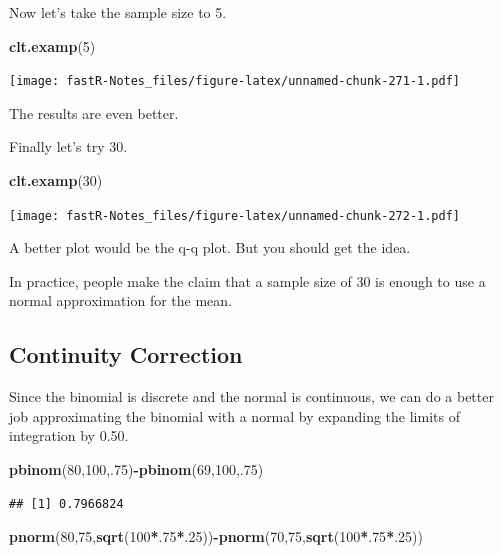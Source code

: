 \documentclass[]{book}
\newenvironment{Shaded}{\begin{snugshade}}{\end{snugshade}}
\newcommand{\KeywordTok}[1]{\textcolor[rgb]{0.13,0.29,0.53}{\textbf{#1}}}
\newcommand{\DecValTok}[1]{\textcolor[rgb]{0.00,0.00,0.81}{#1}}
\newcommand{\OperatorTok}[1]{\textcolor[rgb]{0.81,0.36,0.00}{\textbf{#1}}}
\newcommand{\NormalTok}[1]{#1}
\theoremstyle{definition}
\theoremstyle{definition}
\theoremstyle{definition}
\theoremstyle{remark}
\begin{document}
Now let's take the sample size to 5.

\begin{Shaded}
\begin{Highlighting}[]
\KeywordTok{clt.examp}\NormalTok{(}\DecValTok{5}\NormalTok{)}
\end{Highlighting}
\end{Shaded}

\texttt{[image: fastR-Notes\_files/figure-latex/unnamed-chunk-271-1.pdf]}

The results are even better.

Finally let's try 30.

\begin{Shaded}
\begin{Highlighting}[]
\KeywordTok{clt.examp}\NormalTok{(}\DecValTok{30}\NormalTok{)}
\end{Highlighting}
\end{Shaded}

\texttt{[image: fastR-Notes\_files/figure-latex/unnamed-chunk-272-1.pdf]}

A better plot would be the q-q plot. But you should get the idea.

In practice, people make the claim that a sample size of 30 is enough to
use a normal approximation for the mean.

\subsection{Continuity Correction}\label{continuity-correction}

Since the binomial is discrete and the normal is continuous, we can do a
better job approximating the binomial with a normal by expanding the
limits of integration by 0.50.

\begin{Shaded}
\begin{Highlighting}[]
\KeywordTok{pbinom}\NormalTok{(}\DecValTok{80}\NormalTok{,}\DecValTok{100}\NormalTok{,.}\DecValTok{75}\NormalTok{)}\OperatorTok{-}\KeywordTok{pbinom}\NormalTok{(}\DecValTok{69}\NormalTok{,}\DecValTok{100}\NormalTok{,.}\DecValTok{75}\NormalTok{)}
\end{Highlighting}
\end{Shaded}

\begin{verbatim}
## [1] 0.7966824
\end{verbatim}

\begin{Shaded}
\begin{Highlighting}[]
\KeywordTok{pnorm}\NormalTok{(}\DecValTok{80}\NormalTok{,}\DecValTok{75}\NormalTok{,}\KeywordTok{sqrt}\NormalTok{(}\DecValTok{100}\OperatorTok{*}\NormalTok{.}\DecValTok{75}\OperatorTok{*}\NormalTok{.}\DecValTok{25}\NormalTok{))}\OperatorTok{-}\KeywordTok{pnorm}\NormalTok{(}\DecValTok{70}\NormalTok{,}\DecValTok{75}\NormalTok{,}\KeywordTok{sqrt}\NormalTok{(}\DecValTok{100}\OperatorTok{*}\NormalTok{.}\DecValTok{75}\OperatorTok{*}\NormalTok{.}\DecValTok{25}\NormalTok{))}
\end{Highlighting}
\end{Shaded}
\end{document}
